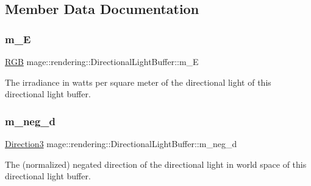 \subsection{Member Data Documentation}
\hypertarget{structmage_1_1rendering_1_1_directional_light_buffer_aeaaec31da683b9ef189e775511db637a}{}\label{structmage_1_1rendering_1_1_directional_light_buffer_aeaaec31da683b9ef189e775511db637a} 
\subsubsection{\texorpdfstring{m\+\_\+E}{m\_E}}
{\footnotesize\ttfamily \hyperlink{structmage_1_1_r_g_b}{R\+GB} mage\+::rendering\+::\+Directional\+Light\+Buffer\+::m\+\_\+E}

The irradiance in watts per square meter of the directional light of this directional light buffer. \hypertarget{structmage_1_1rendering_1_1_directional_light_buffer_acbf55b6ed38011a695cb1feac90a64ed}{}\label{structmage_1_1rendering_1_1_directional_light_buffer_acbf55b6ed38011a695cb1feac90a64ed} 
\subsubsection{\texorpdfstring{m\+\_\+neg\+\_\+d}{m\_neg\_d}}
{\footnotesize\ttfamily \hyperlink{structmage_1_1_direction3}{Direction3} mage\+::rendering\+::\+Directional\+Light\+Buffer\+::m\+\_\+neg\+\_\+d}

The (normalized) negated direction of the directional light in world space of this directional light buffer. \hypertarget{structmage_1_1rendering_1_1_directional_light_buffer_a82d9a78edf5562c3ce041d1a2a7b6a3e}{}\label{structmage_1_1rendering_1_1_directional_light_buffer_a82d9a78edf5562c3ce041d1a2a7b6a3e} 
